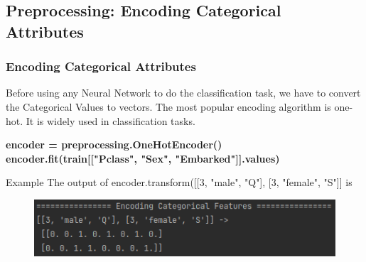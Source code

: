 \documentclass{beamer}
\begin{document}
\subsection{Preprocessing: Encoding Categorical Attributes}
\begin{frame}
	\frametitle{Encoding Categorical Attributes}
	\begin{flushleft}
		Before using any Neural Network to do the classification task, we have to convert the Categorical Values to vectors. The most popular encoding algorithm is one-hot. It is widely used in classification tasks.
	\end{flushleft}
	\begin{center}
		\textbf{\color{blue}
			encoder = preprocessing.OneHotEncoder()~~~~~~~~~~~~~~~~~~ \\
			encoder.fit(train[["Pclass", "Sex", "Embarked"]].values)
		}
	\end{center}
	\begin{block}{Example}
		The output of encoder.transform([[3, "male", "Q"], [3, "female", "S"]] is 
		\begin{center}
			\begin{figure}
		    \includegraphics[width=0.5\linewidth]{./src/figures/8.png}
		  \end{figure}
		\end{center}
	\end{block}
\end{frame}

\end{document}
